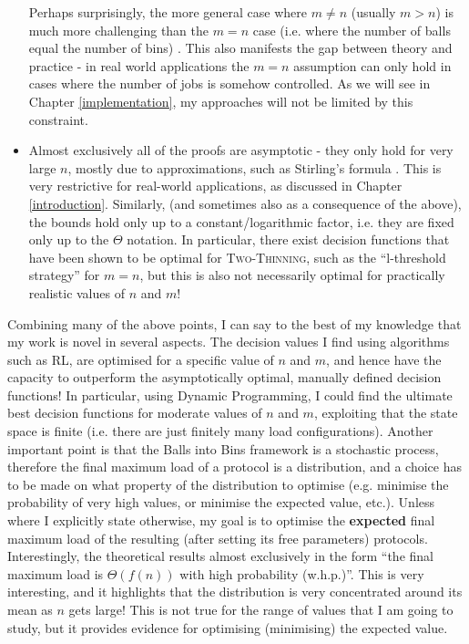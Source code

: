 \begin{itemize}
    Perhaps surprisingly, the more general case where $m\neq n$ (usually $m>n$) is much more challenging than the $m=n$ case (i.e. where the number of balls equal the number of bins) \cite{berenbrink2006heavilyloaded}. This also manifests the gap between theory and practice - in real world applications the $m=n$ assumption can only hold in cases where the number of jobs is somehow controlled. As we will see in Chapter \ref{implementation}, my approaches will not be limited by this constraint.
    \item
    Almost exclusively all of the proofs are asymptotic - they only hold for very large $n$, mostly due to approximations, such as Stirling's formula \cite{feldheim2021thinning}. This is very restrictive for real-world applications, as discussed in Chapter \ref{introduction}. Similarly, (and sometimes also as a consequence of the above), the bounds hold only up to a constant/logarithmic factor, i.e. they are fixed only up to the $\Theta$ notation. In particular, there exist decision functions that have been shown to be optimal for \textsc{Two-Thinning}, such as the ``l-threshold strategy'' for $m=n$, but this is also not necessarily optimal for practically realistic values of $n$ and $m$! 
\end{itemize}


Combining many of the above points, I can say to the best of my knowledge that my work is novel in several aspects. The decision values I find using algorithms such as RL, are optimised for a specific value of $n$ and $m$, and hence have the capacity to outperform the asymptotically optimal, manually defined decision functions! In particular, using Dynamic Programming, I could find the ultimate best decision functions for moderate values of $n$ and $m$, exploiting that the state space is finite (i.e. there are just finitely many load configurations). Another important point is that the Balls into Bins framework is a stochastic process, therefore the final maximum load of a protocol is a distribution, and a choice has to be made on what property of the distribution to optimise (e.g. minimise the probability of very high values, or minimise the expected value, etc.). Unless where I explicitly state otherwise, my goal is to optimise the \textbf{expected} final maximum load of the resulting (after setting its free parameters) protocols. Interestingly, the theoretical results almost exclusively in the form ``the final maximum load is $\Theta(f(n))$ with high probability (w.h.p.)''. This is very interesting, and it highlights that the distribution is very concentrated around its mean as $n$ gets large! This is not true for the range of values that I am going to study, but it provides evidence for optimising (minimising) the expected value. 


